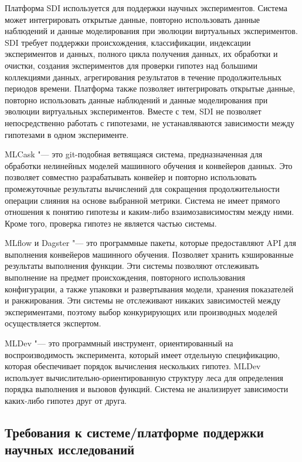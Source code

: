 Платформа SDI \cite{demchenko2013addressing}  используется для поддержки научных экспериментов. Система может 
интегрировать открытые данные, повторно использовать данные наблюдений и данные моделирования при эволюции виртуальных 
экспериментов. SDI требует поддержки происхождения, классификации, индексации экспериментов и данных, полного цикла 
получения данных, их обработки и очистки, создания экспериментов для проверки гипотез над большими коллекциями данных, 
агрегирования результатов в течение продолжительных периодов времени. Платформа также позволяет интегрировать открытые 
данные, повторно использовать данные наблюдений и данные моделирования при эволюции виртуальных экспериментов. 
Вместе с тем, SDI не позволяет непосредственно работать с гипотезами, не устанавляваются зависимости между гипотезами 
в одном эксперименте.

MLCask \cite{Luo2021} "--- это git-подобная ветвящаяся система, предназначенная для обработки нелинейных моделей 
машинного обучения и конвейеров данных. Это позволяет совместно разрабатывать конвейер и повторно использовать 
промежуточные результаты вычислений для сокращения продолжительности операции слияния на основе выбранной метрики. 
Система не имеет прямого отношения к понятию гипотезы и каким-либо взаимозависимостям между ними. Кроме того, проверка 
гипотез не является частью системы.

MLflow \cite{Zaharia2018} и Dagster \cite{Dagster2022} "--- это программные пакеты, которые предоставляют API для 
выполнения конвейеров машинного обучения. Позволяет хранить кэшированные результаты выполнения функции. Эти системы 
позволяют отслеживать выполнение на предмет происхождения, повторного использования конфигурации, а также упаковки и 
развертывания модели, хранения показателей и ранжирования. Эти системы не отслеживают никаких зависимостей между 
экспериментами, поэтому выбор конкурирующих или производных моделей осуществляется экспертом.

MLDev \cite{Khritankov2022} "--- это программный инструмент, ориентированный на воспроизводимость эксперимента, 
который имеет отдельную спецификацию, которая обеспечивает порядок вычисления нескольких гипотез. MLDev использует 
вычислительно-ориентированную структуру леса для определения порядка выполнения и вызовов функций. Система не 
анализирует зависимости каких-либо гипотез друг от друга.

\subsection{Требования к системе/платформе поддержки научных исследований}\label{sect1_3_7}

